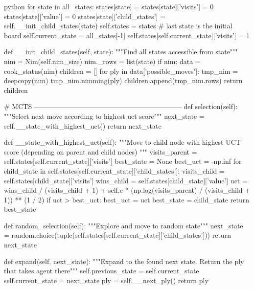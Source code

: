 \begin{mintedbox}{python}
            for state in all_states:
                states[state] = {}
                states[state]['visits'] = 0
                states[state]['value'] = 0
                states[state]['child_states'] = self.__init_child_states(state)
            self.states = states
            # last state is the initial board
            self.current_state = all_states[-1]
            self.states[self.current_state]['visits'] = 1

        def __init_child_states(self, state):
            """Find all states accessible from state"""
            nim = Nim(self.nim_size)
            nim._rows = list(state)
            if nim:
                data = cook_status(nim)
                children = []
                for ply in data['possible_moves']:
                    tmp_nim = deepcopy(nim)
                    tmp_nim.nimming(ply)
                    children.append(tmp_nim.rows)
                return children

        # MCTS -----------------------------------------------------------------
        def selection(self):
            """Select next move according to highest uct score"""
            next_state = self.__state_with_highest_uct()
            return next_state

        def __state_with_highest_uct(self):
            """Move to child node with highest UCT score (depending on parent and child nodes) """
            visits_parent = self.states[self.current_state]['visits']
            best_state = None
            best_uct = -np.inf
            for child_state in self.states[self.current_state]['child_states']:
                visits_child = self.states[child_state]['visits']
                wins_child = self.states[child_state]['value']
                uct = wins_child / (visits_child + 1) + self.c * (np.log(visits_parent) / (visits_child + 1)) ** (1 / 2)
                if uct > best_uct:
                    best_uct = uct
                    best_state = child_state
            return best_state

        def random_selection(self):
            """Explore and move to random state"""
            next_state = random.choice(tuple(self.states[self.current_state]['child_states']))
            return next_state

        def expand(self, next_state):
            """Expand to the found next state. Return the ply that takes agent there"""
            self.previous_state = self.current_state
            self.current_state = next_state
            ply = self.__next_ply()
            return ply


\end{mintedbox}
